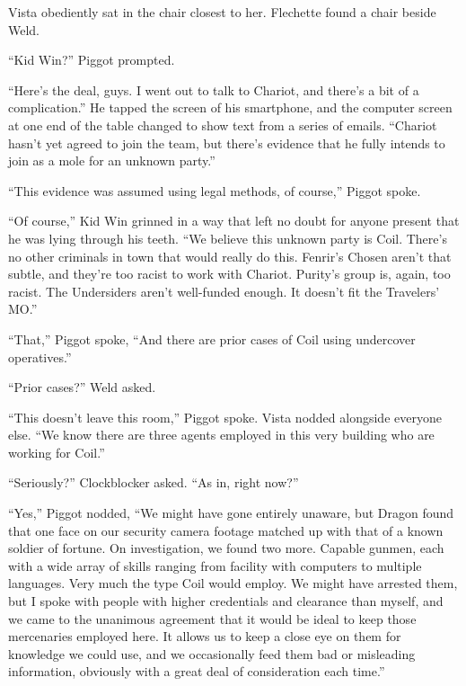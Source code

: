 Vista obediently sat in the chair closest to her.  Flechette found a chair beside Weld.



``Kid Win?'' Piggot prompted.



``Here's the deal, guys.  I went out to talk to Chariot, and there's a bit of a complication.''  He tapped the screen of his smartphone, and the computer screen at one end of the table changed to show text from a series of emails.  ``Chariot hasn't yet agreed to join the team, but there's evidence that he fully intends to join as a mole for an unknown party.''



``This evidence was assumed using legal methods, of course,'' Piggot spoke.



``Of course,'' Kid Win grinned in a way that left no doubt for anyone present that he was lying through his teeth.  ``We believe this unknown party is Coil.  There's no other criminals in town that would really do this.  Fenrir's Chosen aren't that subtle, and they're too racist to work with Chariot.  Purity's group is, again, too racist.  The Undersiders aren't well-funded enough.  It doesn't fit the Travelers' MO.''



``That,'' Piggot spoke, ``And there are prior cases of Coil using undercover operatives.''



``Prior cases?'' Weld asked.



``This doesn't leave this room,'' Piggot spoke.  Vista nodded alongside everyone else.  ``We know there are three agents employed in this very building who are working for Coil.''



``Seriously?'' Clockblocker asked.  ``As in, right now?''



``Yes,'' Piggot nodded, ``We might have gone entirely unaware, but Dragon found that one face on our security camera footage matched up with that of a known soldier of fortune.  On investigation, we found two more.  Capable gunmen, each with a wide array of skills ranging from facility with computers to multiple languages.  Very much the type Coil would employ.  We might have arrested them, but I spoke with people with higher credentials and clearance than myself, and we came to the unanimous agreement that it would be ideal to keep those mercenaries employed here.  It allows us to keep a close eye on them for knowledge we could use, and we occasionally feed them bad or misleading information, obviously with a great deal of consideration each time.''



